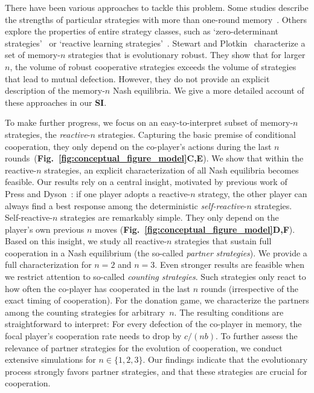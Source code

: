 \documentclass[9pt,twocolumn,twoside]{pnas-new}
\newcommand{\figref}[1]{{\textbf{Fig.~\ref{#1}}}}
\def\SI{\textbf{SI}}
\begin{document}
There have been various approaches to tackle this problem. 
Some studies describe the strengths of particular strategies with more than one-round memory~\citep{Do:JTB:2017,hilbe:PNAS:2017,murase:SciRep:2020,li:NatureCompSci:2022}. 
Others explore the properties of entire strategy classes, such as `zero-determinant strategies'~\cite{ueda:RSOP:2021, Ueda:ORF:2022} or `reactive learning strategies'~\cite{mcavoy:PRSA:2019}. 
Stewart and Plotkin~\cite{stewart:scientific:2016} characterize a set of memory-$n$ strategies that is evolutionary robust. 
They show that for larger $n$, the volume of robust cooperative strategies exceeds the volume of strategies that lead to mutual defection. 
However, they do not provide an explicit description of the memory-$n$ Nash equilibria. 
We give a more detailed account of these approaches in our \SI. 

To make further progress, we focus on an easy-to-interpret subset of memory-$n$ strategies, the {\it reactive}-$n$ strategies. 
Capturing the basic premise of conditional cooperation, they only depend on the co-player's actions during the last $n$ rounds~(\figref{fig:conceptual_figure_model}\textbf{C,E}). 
We show that within the reactive-$n$ strategies, an explicit characterization of all Nash equilibria becomes feasible. 
Our results rely on a central insight, motivated by previous work of Press and Dyson~\citep{press:PNAS:2012}: 
if one player adopts a reactive-$n$ strategy, the other player can always find a best response among the deterministic {\it self-reactive}-$n$ strategies. 
Self-reactive-$n$ strategies are remarkably simple. 
They only depend on the player's own previous $n$ moves (\figref{fig:conceptual_figure_model}\textbf{D,F}).
Based on this insight, we study all reactive-$n$ strategies that sustain full cooperation in a Nash equilibrium (the so-called {\it partner strategies}). 
We provide a full characterization for $n\!=\!2$ and $n\!=\!3$.
Even stronger results are feasible when we restrict attention to so-called {\it counting strategies}.  
Such strategies only react to how often the co-player has cooperated in the last $n$ rounds (irrespective of the exact timing of cooperation). 
For the donation game, we characterize the partners among the counting strategies for arbitrary~$n$. 
The resulting conditions are straightforward to interpret:
For every defection of the co-player in memory, the focal player's cooperation rate needs to drop by $c/(nb)$.
To further assess the relevance of partner strategies for the evolution of cooperation, we conduct extensive simulations for $n\!\in\!\{1,2,3\}$. 
Our findings indicate that the evolutionary process strongly favors partner strategies, and that these strategies are crucial for cooperation. 
\end{document}
